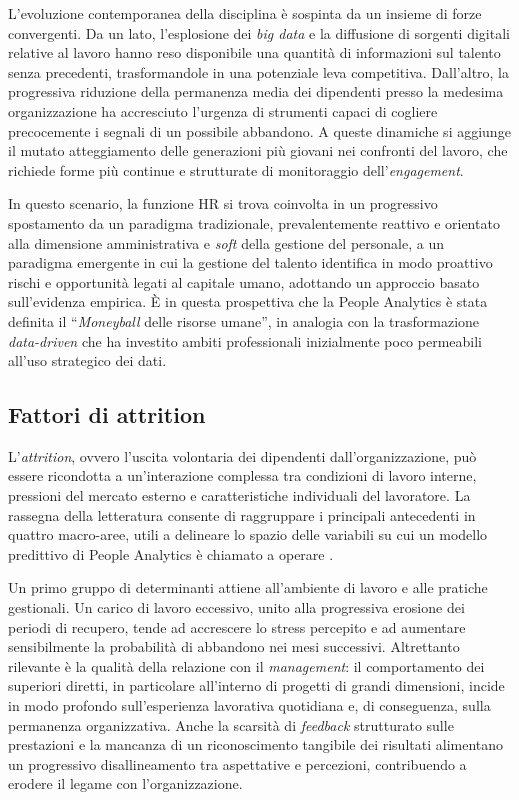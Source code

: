 L'evoluzione contemporanea della disciplina è sospinta da un insieme di forze convergenti. Da un lato, l'esplosione dei \textit{big data} e la diffusione di sorgenti digitali relative al lavoro hanno reso disponibile una quantità di informazioni sul talento senza precedenti, trasformandole in una potenziale leva competitiva. Dall'altro, la progressiva riduzione della permanenza media dei dipendenti presso la medesima organizzazione ha accresciuto l'urgenza di strumenti capaci di cogliere precocemente i segnali di un possibile abbandono. A queste dinamiche si aggiunge il mutato atteggiamento delle generazioni più giovani nei confronti del lavoro, che richiede forme più continue e strutturate di monitoraggio dell'\textit{engagement}.

In questo scenario, la funzione HR si trova coinvolta in un progressivo spostamento da un paradigma tradizionale, prevalentemente reattivo e orientato alla dimensione amministrativa e \textit{soft} della gestione del personale, a un paradigma emergente in cui la gestione del talento identifica in modo proattivo rischi e opportunità legati al capitale umano, adottando un approccio basato sull'evidenza empirica. È in questa prospettiva che la People Analytics è stata definita il ``\textit{Moneyball} delle risorse umane'', in analogia con la trasformazione \textit{data-driven} che ha investito ambiti professionali inizialmente poco permeabili all'uso strategico dei dati.

\subsection{Fattori di attrition}

L'\textit{attrition}, ovvero l'uscita volontaria dei dipendenti dall'organizzazione, può essere ricondotta a un'interazione complessa tra condizioni di lavoro interne, pressioni del mercato esterno e caratteristiche individuali del lavoratore. La rassegna della letteratura consente di raggruppare i principali antecedenti in quattro macro-aree, utili a delineare lo spazio delle variabili su cui un modello predittivo di People Analytics è chiamato a operare \cite{Isson_Harriott_2016}.

Un primo gruppo di determinanti attiene all'ambiente di lavoro e alle pratiche gestionali. Un carico di lavoro eccessivo, unito alla progressiva erosione dei periodi di recupero, tende ad accrescere lo stress percepito e ad aumentare sensibilmente la probabilità di abbandono nei mesi successivi. Altrettanto rilevante è la qualità della relazione con il \textit{management}: il comportamento dei superiori diretti, in particolare all'interno di progetti di grandi dimensioni, incide in modo profondo sull'esperienza lavorativa quotidiana e, di conseguenza, sulla permanenza organizzativa. Anche la scarsità di \textit{feedback} strutturato sulle prestazioni e la mancanza di un riconoscimento tangibile dei risultati alimentano un progressivo disallineamento tra aspettative e percezioni, contribuendo a erodere il legame con l'organizzazione.


